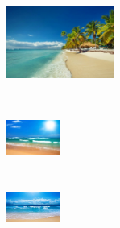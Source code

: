 \begin{frame}
	\begin{columns}
		\begin{overlayarea}{\textwidth}{\textheight}
		\begin{figure}
		\includegraphics[height=100pt,width=100pt]{images/cloudybeach1}
		\end{figure}

		\begin{minipage}{1\linewidth}
		\begin{minipage}{0.45\linewidth}
		\begin{figure}
		\includegraphics[height=50pt,width=50pt]{images/cloudybeach}
		\end{figure}
		\end{minipage}
		\begin{minipage}{0.45\linewidth}
		\begin{figure}
		\includegraphics[height=50pt,width=50pt]{images/cloudybeach2}
		\end{figure}
		\end{minipage}
		\end{minipage}	
		\vspace{-0.05in}


\end{overlayarea}
\end{columns}
\end{frame}

